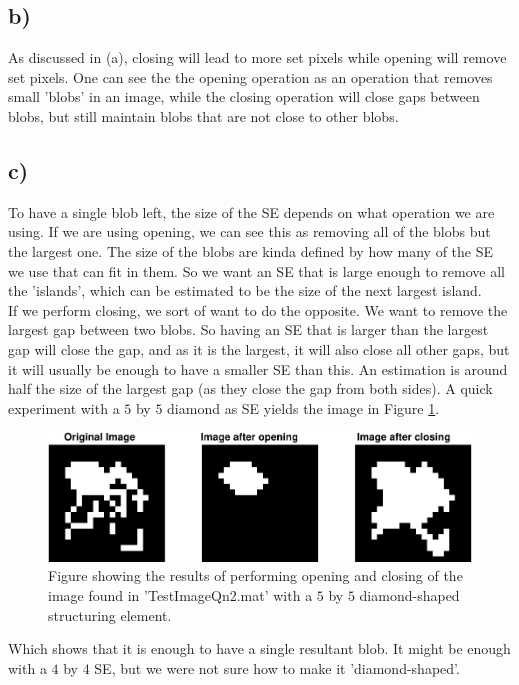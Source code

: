 \documentclass[a4paper]{article}
\begin{document}
\subsection*{b)}
As discussed in (a), closing will lead to more set pixels while opening will remove set pixels. One can see the the opening operation as an operation that removes small 'blobs' in an image, while the closing operation will close gaps between blobs, but still maintain blobs that are not close to other blobs.

\subsection*{c)}
To have a single blob left, the size of the SE depends on what operation we are using. If we are using opening, we can see this as removing all of the blobs but the largest one. The size of the blobs are kinda defined by how many of the SE we use that can fit in them. So we want an SE that is large enough to remove all the 'islands', which can be estimated to be the size of the next largest island. \\
If we perform closing, we sort of want to do the opposite. We want to remove the largest gap between two blobs. So having an SE that is larger than the largest gap will close the gap, and as it is the largest, it will also close all other gaps, but it will usually be enough to have a smaller SE than this. An estimation is around half the size of the largest gap (as they close the gap from both sides). A quick experiment with a $5$ by $5$ diamond as SE yields the image in Figure \ref{2_1c}.
\begin{figure}[H]
  \centering
  \captionsetup{justification=centering}
  \includegraphics[width=\textwidth]{q2_1b-crop.pdf}
  \caption{Figure showing the results of performing opening and closing of the image found in 'TestImageQn2.mat' with a $5$ by $5$ diamond-shaped structuring element.}
  \label{2_1c}
\end{figure}
Which shows that it is enough to have a single resultant blob. It might be enough with a $4$ by $4$ SE, but we were not sure how to make it 'diamond-shaped'.
\end{document}
